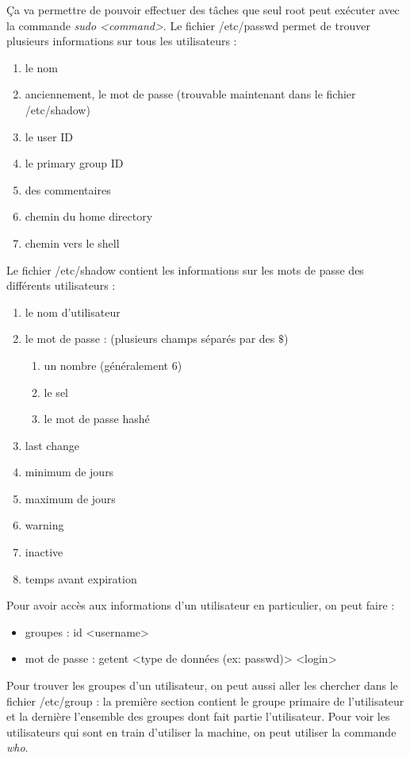 \documentclass{article}
\begin{document}
\noindent Ça va permettre de pouvoir effectuer des tâches que seul root peut exécuter avec la commande \textit{sudo <command>}.\newline
Le fichier /etc/passwd permet de trouver plusieurs informations sur tous les utilisateurs :
\begin{enumerate}
    \item le nom
    \item anciennement, le mot de passe (trouvable maintenant dans le fichier /etc/shadow)
    \item le user ID
    \item le primary group ID
    \item des commentaires
    \item chemin du home directory
    \item chemin vers le shell
\end{enumerate}
\noindent Le fichier /etc/shadow contient les informations sur les mots de passe des différents utilisateurs :
\begin{enumerate}
    \item le nom d'utilisateur
    \item le mot de passe : (plusieurs champs séparés par des $\$$)
        \begin{enumerate}
            \item un nombre (généralement 6)
            \item le sel
            \item le mot de passe hashé
        \end{enumerate}
    \item last change
    \item minimum de jours
    \item maximum de jours
    \item warning
    \item inactive
    \item temps avant expiration
\end{enumerate}

Pour avoir accès aux informations d'un utilisateur en particulier, on peut faire :
\begin{itemize}
    \item groupes : id <username>
    \item mot de passe : getent <type de données (ex: passwd)> <login>
\end{itemize}

\noindent Pour trouver les groupes d'un utilisateur, on peut aussi aller les chercher dans le fichier /etc/group : la première section contient le groupe primaire de l'utilisateur et la dernière l'ensemble des groupes dont fait partie l'utilisateur.\newline
Pour voir les utilisateurs qui sont en train d'utiliser la machine, on peut utiliser la commande \textit{who}.
\end{document}
